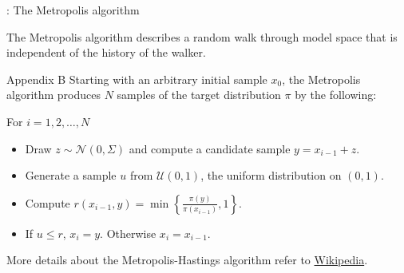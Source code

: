 

\begin{frame}[c]{\titleprefix: The Metropolis algorithm}

  \tiny

  The Metropolis algorithm describes a random walk through model space that
  is independent of the history of the walker.

  \begin{block}{Appendix B}
    Starting with an arbitrary initial sample $x_0$,
    the Metropolis algorithm produces $N$ samples of
    the target distribution $\pi$ by the following:

    For $i = 1, 2, \ldots, N$
    \begin{itemize}
      \tiny
      \item Draw $z \sim \mathcal{N}(0, \Sigma)$ and compute a candidate sample
      $y = x_{i - 1} + z$.

      \item Generate a sample $u$ from $\mathcal{U}(0, 1)$, the uniform
      distribution on $(0, 1)$.

      \item Compute $r(x_{i - 1}, y) = \min \left\{ \frac{\pi(y)}
      {\pi(x_{i - 1})}, 1 \right\}$.

      \item If $u \leq r$, $x_i = y$. Otherwise $x_i = x_{i - 1}$.
    \end{itemize}

  \end{block}

  More details about the Metropolis-Hastings algorithm refer to
  \href{https://en.wikipedia.org/wiki/%
  Metropolis-Hastings_algorithm\#Formal_derivation}{Wikipedia}.

\end{frame}

